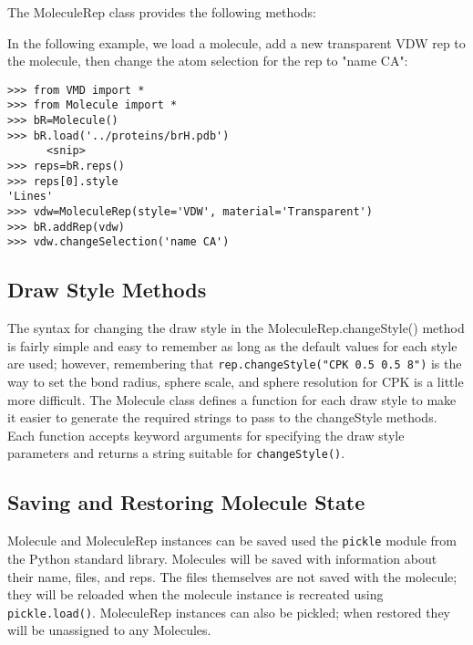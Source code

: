 The MoleculeRep class provides the following methods:
\begin{itemize}
\end{itemize}

In the following example, we load a molecule, add a new transparent VDW rep
to the molecule, then change the atom selection for the rep to "name CA":

\begin{verbatim}
>>> from VMD import *
>>> from Molecule import *
>>> bR=Molecule()
>>> bR.load('../proteins/brH.pdb')
      <snip>
>>> reps=bR.reps()
>>> reps[0].style
'Lines'
>>> vdw=MoleculeRep(style='VDW', material='Transparent')
>>> bR.addRep(vdw)     
>>> vdw.changeSelection('name CA')
\end{verbatim}

\subsection{Draw Style Methods}
The syntax for changing the draw style in the MoleculeRep.changeStyle()
method is fairly simple and easy to remember as long as the default values
for each style are used; however, remembering that 
{\tt rep.changeStyle("CPK 0.5 0.5 8")} is the way to set the bond radius,
sphere scale, and sphere resolution for CPK is a little more difficult.
The Molecule class defines a function for each draw style to make it easier
to generate the required strings to pass to the changeStyle methods.
Each function accepts keyword arguments for specifying the draw style
parameters and returns a string suitable for {\tt changeStyle()}.  


\subsection{Saving and Restoring Molecule State}
Molecule and MoleculeRep instances can be saved used the {\tt pickle}
module from the Python standard library.  Molecules will be saved with
information about their name, files, and reps.  The files themselves
are not saved with the molecule; they will be reloaded when the molecule
instance is recreated using {\tt pickle.load()}.  MoleculeRep instances
can also be pickled; when restored they will be unassigned to any Molecules.

